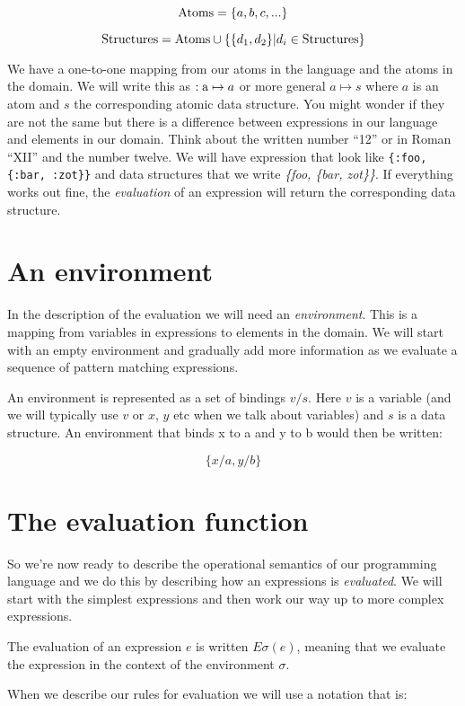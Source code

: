 \documentclass[a4paper,11pt]{article}
\begin{document}
$${\rm Atoms} =  \{a,b,c, ...\}$$

$${\rm Structures} = {\rm Atoms} \cup \{\{d_1, d_2\} | d_i \in {\rm Structures}\}$$

We have a one-to-one mapping from our atoms in the language and the
atoms in the domain. We will write this as ${\rm :a} \mapsto a$ or
more general $a \mapsto s$ where $a$ is an atom and $s$ the
corresponding atomic data structure. You might wonder if they are not
the same but there is a difference between expressions in our language
and elements in our domain. Think about the written number ``12'' or
in Roman ``XII'' and the number twelve. We will have expression that
look like {\tt \{:foo, \{:bar, :zot\}\}} and data structures that we
write {\em \{foo, \{bar, zot\}\}}. If everything works out fine, the
{\em evaluation} of an expression will return the corresponding data
structure.

\section{An environment}

In the description of the evaluation we will need an {\em
  environment}. This is a mapping from variables in expressions to
elements in the domain. We will start with an empty environment and
gradually add more information as we evaluate a sequence of pattern
matching expressions. 

An environment is represented as a set of bindings $v/s$. Here $v$ is
a variable (and we will typically use $v$ or $x$, $y$ etc when we talk
about variables) and $s$ is a data structure. An environment that
binds x to a and y to b would then be written:

$$\{x/a, y/b\}$$


\section{The evaluation function}

So we're now ready to describe the operational semantics of our
programming language and we do this by describing how an expressions is
{\em evaluated}. We will start with the simplest expressions and then
work our way up to more complex expressions.

The evaluation of an expression $e$ is written $E\sigma(e)$, meaning
that we evaluate the expression in the context of the environment $\sigma$.

When we describe our rules for evaluation we will use
 a notation that is:
\end{document}
